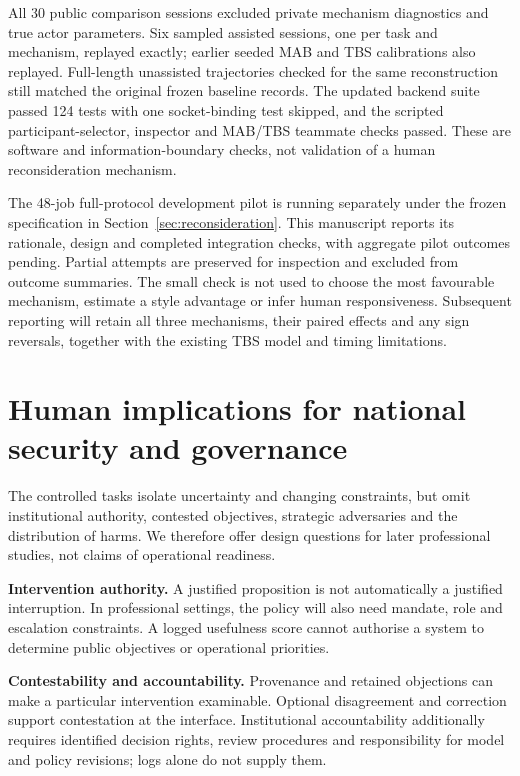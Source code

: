 \documentclass[11pt,a4paper]{article}
\begin{document}
All 30 public comparison sessions excluded private mechanism diagnostics and true actor parameters. Six sampled assisted sessions, one per task and mechanism, replayed exactly; earlier seeded MAB and TBS calibrations also replayed. Full-length unassisted trajectories checked for the same reconstruction still matched the original frozen baseline records. The updated backend suite passed 124 tests with one socket-binding test skipped, and the scripted participant-selector, inspector and MAB/TBS teammate checks passed. These are software and information-boundary checks, not validation of a human reconsideration mechanism.

The 48-job full-protocol development pilot is running separately under the frozen specification in Section~\ref{sec:reconsideration}. This manuscript reports its rationale, design and completed integration checks, with aggregate pilot outcomes pending. Partial attempts are preserved for inspection and excluded from outcome summaries. The small check is not used to choose the most favourable mechanism, estimate a style advantage or infer human responsiveness. Subsequent reporting will retain all three mechanisms, their paired effects and any sign reversals, together with the existing TBS model and timing limitations.

\section{Human implications for national security and governance}
The controlled tasks isolate uncertainty and changing constraints, but omit institutional authority, contested objectives, strategic adversaries and the distribution of harms. We therefore offer design questions for later professional studies, not claims of operational readiness.

\textbf{Intervention authority.} A justified proposition is not automatically a justified interruption. In professional settings, the policy will also need mandate, role and escalation constraints. A logged usefulness score cannot authorise a system to determine public objectives or operational priorities.

\textbf{Contestability and accountability.} Provenance and retained objections can make a particular intervention examinable. Optional disagreement and correction support contestation at the interface. Institutional accountability additionally requires identified decision rights, review procedures and responsibility for model and policy revisions; logs alone do not supply them.
\end{document}

